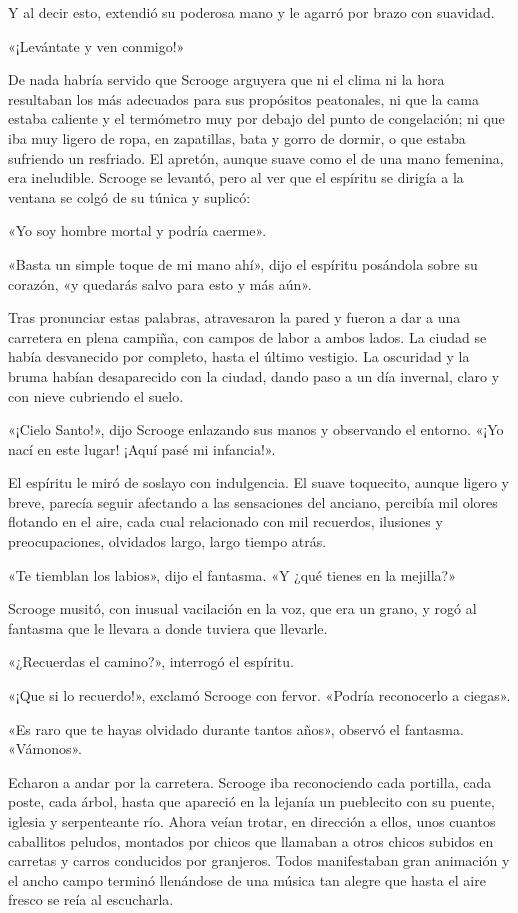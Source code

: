 \documentclass{novela}
\begin{document}
 Y al decir esto, extendió su poderosa mano y le agarró por brazo con suavidad.

 «¡Levántate y ven conmigo!»

 De nada habría servido que Scrooge arguyera que ni el clima ni la hora resultaban los más adecuados para sus propósitos peatonales, ni que la cama estaba caliente y el termómetro muy por debajo del punto de congelación; ni que iba muy ligero de ropa, en zapatillas, bata y gorro de dormir, o que estaba sufriendo un resfriado. El apretón, aunque suave como el de una mano femenina, era ineludible. Scrooge se levantó, pero al ver que el espíritu se dirigía a la ventana se colgó de su túnica y suplicó:

 «Yo soy hombre mortal y podría caerme».

 «Basta un simple toque de mi mano ahí», dijo el espíritu posándola sobre su corazón, «y quedarás salvo para esto y más aún».

 Tras pronunciar estas palabras, atravesaron la pared y fueron a dar a una carretera en plena campiña, con campos de labor a ambos lados. La ciudad se había desvanecido por completo, hasta el último vestigio. La oscuridad y la bruma habían desaparecido con la ciudad, dando paso a un día invernal, claro y con nieve cubriendo el suelo.

 «¡Cielo Santo!», dijo Scrooge enlazando sus manos y observando el entorno. «¡Yo nací en este lugar! ¡Aquí pasé mi infancia!».

 El espíritu le miró de soslayo con indulgencia. El suave toquecito, aunque ligero y breve, parecía seguir afectando a las sensaciones del anciano, percibía mil olores flotando en el aire, cada cual relacionado con mil recuerdos, ilusiones y preocupaciones, olvidados largo, largo tiempo atrás.

 «Te tiemblan los labios», dijo el fantasma. «Y ¿qué tienes en la mejilla?»

 Scrooge musitó, con inusual vacilación en la voz, que era un grano, y rogó al fantasma que le llevara a donde tuviera que llevarle.

 «¿Recuerdas el camino?», interrogó el espíritu.

 «¡Que si lo recuerdo!», exclamó Scrooge con fervor. «Podría reconocerlo a ciegas».

 «Es raro que te hayas olvidado durante tantos años», observó el fantasma. «Vámonos».

 Echaron a andar por la carretera. Scrooge iba reconociendo cada portilla, cada poste, cada árbol, hasta que apareció en la lejanía un pueblecito con su puente, iglesia y serpenteante río. Ahora veían trotar, en dirección a ellos, unos cuantos caballitos peludos, montados por chicos que llamaban a otros chicos subidos en carretas y carros conducidos por granjeros. Todos manifestaban gran animación y el ancho campo terminó llenándose de una música tan alegre que hasta el aire fresco se reía al escucharla.
\end{document}
